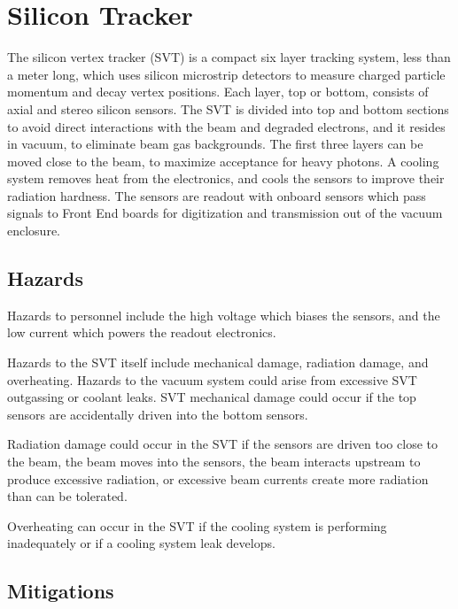 \graphicspath{{hps/figs/}}
\renewcommand{\dirfig}[0]{hps/figs}
\renewcommand{\dircur}[0]{hps}

\section{Silicon Tracker}
\indent

The silicon vertex tracker (SVT) is a compact six layer tracking system, less than a meter long, which uses silicon microstrip detectors to measure charged particle momentum and decay vertex positions. Each layer, top or bottom, consists of axial and stereo silicon sensors. The SVT  is divided into top and bottom sections  to avoid direct interactions with the beam and degraded electrons, and it resides in vacuum, to eliminate beam gas backgrounds. The first three layers can be moved close to the beam, to maximize acceptance for heavy photons. A cooling system removes heat from the electronics, and cools the sensors to improve their radiation hardness.  The sensors are readout with onboard sensors which pass signals to Front End boards for digitization and transmission out of the vacuum enclosure.

\subsection{Hazards} 
\indent

Hazards to personnel include the high voltage which biases the sensors, and the low current which powers the readout electronics.

Hazards to the SVT itself include mechanical damage, radiation damage, and overheating. Hazards to the vacuum system could arise from excessive SVT outgassing or coolant leaks.
SVT mechanical damage could occur if the top sensors are accidentally driven into the bottom sensors.

Radiation damage could occur in the SVT  if the sensors are driven too close to the beam, the beam moves into the sensors, the beam interacts upstream to produce excessive radiation, or excessive beam currents create more radiation than can be tolerated.

Overheating can occur in the SVT  if the cooling system is performing inadequately or if a cooling system leak develops.

\subsection{Mitigations}
\indent

